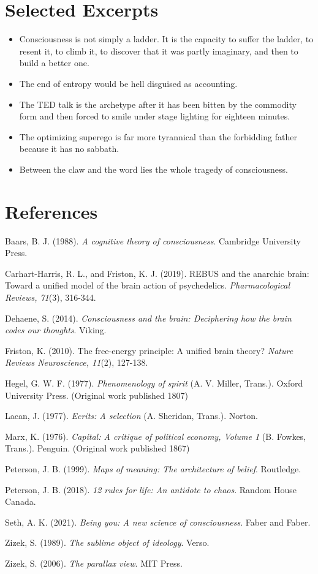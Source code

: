 \documentclass[a4paper,11pt]{article}
\begin{document}
\section*{Selected Excerpts}
\begin{itemize}
\item Consciousness is not simply a ladder. It is the capacity to suffer the ladder, to resent it, to climb it, to discover that it was partly imaginary, and then to build a better one.
\item The end of entropy would be hell disguised as accounting.
\item The TED talk is the archetype after it has been bitten by the commodity form and then forced to smile under stage lighting for eighteen minutes.
\item The optimizing superego is far more tyrannical than the forbidding father because it has no sabbath.
\item Between the claw and the word lies the whole tragedy of consciousness.
\end{itemize}

\section*{References}
\begingroup
\small
Baars, B. J. (1988). \textit{A cognitive theory of consciousness}. Cambridge University Press.\par
Carhart-Harris, R. L., and Friston, K. J. (2019). REBUS and the anarchic brain: Toward a unified model of the brain action of psychedelics. \textit{Pharmacological Reviews, 71}(3), 316-344.\par
Dehaene, S. (2014). \textit{Consciousness and the brain: Deciphering how the brain codes our thoughts}. Viking.\par
Friston, K. (2010). The free-energy principle: A unified brain theory? \textit{Nature Reviews Neuroscience, 11}(2), 127-138.\par
Hegel, G. W. F. (1977). \textit{Phenomenology of spirit} (A. V. Miller, Trans.). Oxford University Press. (Original work published 1807)\par
Lacan, J. (1977). \textit{Ecrits: A selection} (A. Sheridan, Trans.). Norton.\par
Marx, K. (1976). \textit{Capital: A critique of political economy, Volume 1} (B. Fowkes, Trans.). Penguin. (Original work published 1867)\par
Peterson, J. B. (1999). \textit{Maps of meaning: The architecture of belief}. Routledge.\par
Peterson, J. B. (2018). \textit{12 rules for life: An antidote to chaos}. Random House Canada.\par
Seth, A. K. (2021). \textit{Being you: A new science of consciousness}. Faber and Faber.\par
Zizek, S. (1989). \textit{The sublime object of ideology}. Verso.\par
Zizek, S. (2006). \textit{The parallax view}. MIT Press.\par
\endgroup
\end{document}

